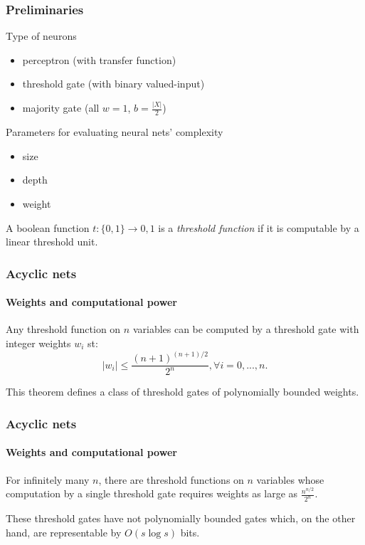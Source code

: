 \documentclass{beamer}
\begin{document}
\begin{frame}
\frametitle{Preliminaries}
Type of neurons
\begin{itemize}
	\item perceptron (with transfer function)
	\item threshold gate (with binary valued-input)
	\item majority gate (all $w=1$, $b=\frac{|X|}{2}$)
\end{itemize}
Parameters for evaluating neural nets' complexity
\begin{itemize}
	\item size
	\item depth
	\item weight
\end{itemize}
\begin{definition}
	A boolean function $t: \{0,1\} \to {0,1} $ is a \textit{threshold function} if it is computable by a linear threshold unit.
\end{definition}
\end{frame}

\begin{frame}
\frametitle{Acyclic nets}
\framesubtitle{Weights and computational power}	
	\begin{theorem}
		Any threshold function on $n$ variables can be computed by a threshold gate with integer weights $w_i$ st: $$|w_i| \leq \frac{(n+1)^{(n+1)/2}}{2^n}, \forall i =0,...,n.$$
	\end{theorem}
	This theorem defines a class of threshold gates of polynomially bounded weights.
\end{frame}

\begin{frame}
\frametitle{Acyclic nets}
\framesubtitle{Weights and computational power}	
\begin{theorem}
For infinitely many $n$, there are threshold functions on $n$ variables whose computation by a single threshold gate requires weights as large as $\frac{n^{n/2}}{2^n}.$
\end{theorem}
These threshold gates have not polynomially bounded gates which, on the other hand, are representable by  $O(s \log{s})$ bits.
\end{frame}
\end{document}
